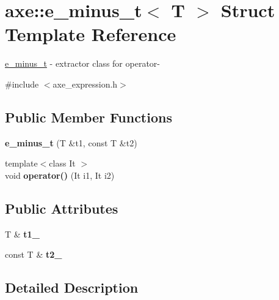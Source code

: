 \hypertarget{structaxe_1_1e__minus__t}{\section{axe\+:\+:e\+\_\+minus\+\_\+t$<$ T $>$ Struct Template Reference}
\label{structaxe_1_1e__minus__t}
}


\hyperlink{structaxe_1_1e__minus__t}{e\+\_\+minus\+\_\+t} -\/ extractor class for operator-\/  




{\ttfamily \#include $<$axe\+\_\+expression.\+h$>$}

\subsection*{Public Member Functions}
\begin{DoxyCompactItemize}
\item 
\hypertarget{structaxe_1_1e__minus__t_a285ffd2043c71a934735b13b0a99e7eb}{{\bfseries e\+\_\+minus\+\_\+t} (T \&t1, const T \&t2)}\label{structaxe_1_1e__minus__t_a285ffd2043c71a934735b13b0a99e7eb}

\item 
\hypertarget{structaxe_1_1e__minus__t_a70d0519752b32c551b78fa30cfcdeb28}{{\footnotesize template$<$class It $>$ }\\void {\bfseries operator()} (It i1, It i2)}\label{structaxe_1_1e__minus__t_a70d0519752b32c551b78fa30cfcdeb28}

\end{DoxyCompactItemize}
\subsection*{Public Attributes}
\begin{DoxyCompactItemize}
\item 
\hypertarget{structaxe_1_1e__minus__t_acf9d7b17d97f93aa6d876b00a0d9f5be}{T \& {\bfseries t1\+\_\+}}\label{structaxe_1_1e__minus__t_acf9d7b17d97f93aa6d876b00a0d9f5be}

\item 
\hypertarget{structaxe_1_1e__minus__t_adc162164e4ad7b350988ceafd356026e}{const T \& {\bfseries t2\+\_\+}}\label{structaxe_1_1e__minus__t_adc162164e4ad7b350988ceafd356026e}

\end{DoxyCompactItemize}


\subsection{Detailed Description}
